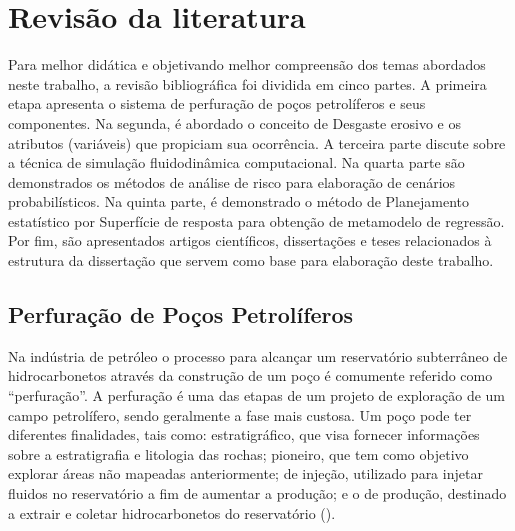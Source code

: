 \chapter{Revisão da literatura}
Para melhor didática e objetivando melhor compreensão dos temas abordados neste trabalho, a revisão bibliográfica foi dividida em cinco partes. A primeira etapa apresenta o sistema de perfuração de poços petrolíferos e seus componentes. Na segunda, é abordado o conceito de Desgaste erosivo e os atributos (variáveis) que propiciam sua ocorrência. A terceira parte discute sobre a técnica de simulação fluidodinâmica computacional. Na quarta parte são demonstrados os métodos de análise de risco para elaboração de cenários probabilísticos. Na quinta parte, é demonstrado o método de Planejamento estatístico por Superfície de resposta para obtenção de metamodelo de regressão. Por fim, são apresentados artigos científicos, dissertações e teses relacionados à estrutura da dissertação que servem como base para elaboração deste trabalho.

\section{Perfuração de Poços Petrolíferos}

Na indústria de petróleo o processo para alcançar um reservatório subterrâneo de hidrocarbonetos através da construção de um poço é comumente referido como “perfuração”. A perfuração é uma das etapas de um projeto de exploração de um campo petrolífero, sendo geralmente a fase mais custosa. Um poço pode ter diferentes finalidades, tais como: estratigráfico, que visa fornecer informações sobre a estratigrafia e litologia das rochas; pioneiro, que tem como objetivo explorar áreas não mapeadas anteriormente; de injeção, utilizado para injetar fluidos no reservatório a fim de aumentar a produção; e o de produção, destinado a extrair e coletar hidrocarbonetos do reservatório (\cite{thomas}).

